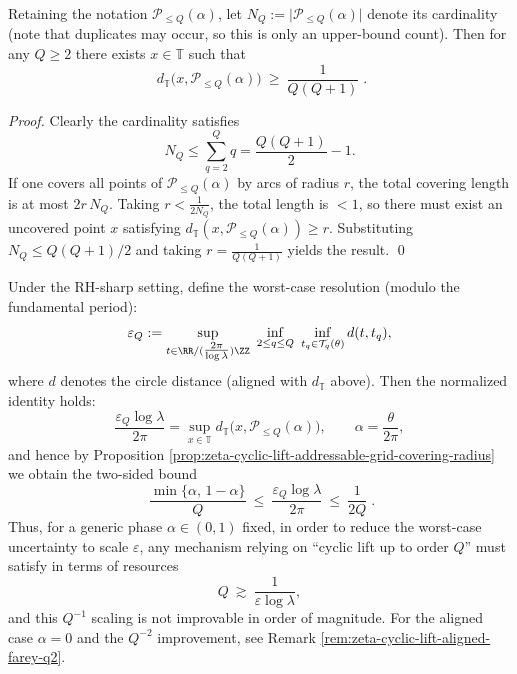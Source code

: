 \begin{proposition}\label{prop:zeta-cyclic-lift-covering-radius-counting-lb}
Retaining the notation \(\mathcal P_{\le Q}(\alpha)\), let
\(
N_Q:=\bigl|\mathcal P_{\le Q}(\alpha)\bigr|
\)
denote its cardinality (note that duplicates may occur, so this is only an upper-bound count).
Then for any \(Q\ge 2\) there exists \(x\in\mathbb T\) such that
\[
\boxed{\;
d_{\mathbb T}\bigl(x,\mathcal P_{\le Q}(\alpha)\bigr)\ \ge\ \frac{1}{Q(Q+1)}\; }.
\]
\end{proposition}
\begin{proof}
Clearly the cardinality satisfies
\[
N_Q\le \sum_{q=2}^{Q} q=\frac{Q(Q+1)}{2}-1.
\]
If one covers all points of \(\mathcal P_{\le Q}(\alpha)\) by arcs of radius \(r\), the total covering length is at most \(2r\,N_Q\).
Taking \(r<\frac{1}{2N_Q}\), the total length is \(<1\), so there must exist an uncovered point \(x\) satisfying
\(
d_{\mathbb T}(x,\mathcal P_{\le Q}(\alpha))\ge r
\).
Substituting \(N_Q\le Q(Q+1)/2\) and taking \(r=\frac{1}{Q(Q+1)}\) yields the result. \qed
\end{proof}

\begin{corollary}\label{cor:zeta-cyclic-lift-resolution-law}
Under the RH-sharp setting, define the worst-case resolution (modulo the fundamental period):
\[
\varepsilon_Q:=\sup_{t\in \RR/(\tfrac{2\pi}{\log\lambda})\ZZ}\ \inf_{2\le q\le Q}\ \inf_{t_q\in\mathcal T_q(\theta)} d(t,t_q),
\]
where \(d\) denotes the circle distance (aligned with \(d_{\mathbb T}\) above).
Then the normalized identity holds:
\[
\frac{\varepsilon_Q\log\lambda}{2\pi}
=\sup_{x\in\mathbb T} d_{\mathbb T}\bigl(x,\mathcal P_{\le Q}(\alpha)\bigr),
\qquad \alpha=\frac{\theta}{2\pi},
\]
and hence by Proposition \ref{prop:zeta-cyclic-lift-addressable-grid-covering-radius} we obtain the two-sided bound
\[
\boxed{\;
\frac{\min\{\alpha,\,1-\alpha\}}{Q}
\ \le\
\frac{\varepsilon_Q\log\lambda}{2\pi}
\ \le\
\frac{1}{2Q}\; }.
\]
Thus, for a generic phase \(\alpha\in(0,1)\) fixed, in order to reduce the worst-case uncertainty to scale \(\varepsilon\), any mechanism relying on ``cyclic lift up to order \(Q\)'' must satisfy in terms of resources
\[
Q\ \gtrsim\ \frac{1}{\varepsilon\log\lambda},
\]
and this \(Q^{-1}\) scaling is not improvable in order of magnitude.
For the aligned case \(\alpha=0\) and the \(Q^{-2}\) improvement, see Remark \ref{rem:zeta-cyclic-lift-aligned-farey-q2}.
\end{corollary}

